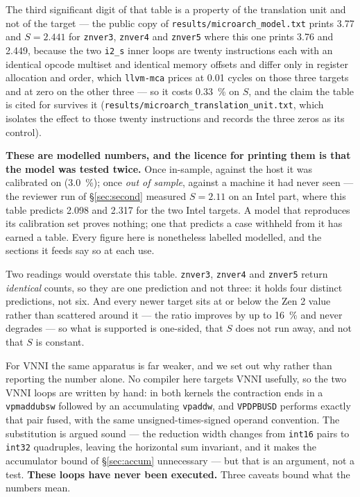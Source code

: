 \documentclass[11pt,a4paper]{article}
\newcommand{\code}[1]{\texttt{#1}}
\begin{document}
The third significant digit of that table is a property of the translation unit
and not of the target --- the public copy of
\code{results/microarch\_model.txt} prints \num{3.77} and $S=\num{2.441}$ for
\code{znver3}, \code{znver4} and \code{znver5} where this one prints \num{3.76}
and \num{2.449}, because the two \code{i2\_s} inner loops are twenty
instructions each with an identical opcode multiset and identical memory offsets
and differ only in register allocation and order, which \code{llvm-mca} prices
at \num{0.01} cycles on those three targets and at zero on the other three ---
so it costs \SI{0.33}{\percent} on $S$, and the claim the table is cited for
survives it (\code{results/microarch\_translation\_unit.txt}, which isolates
the effect to those twenty instructions and records the three zeros as its
control).

\textbf{These are modelled numbers, and the licence for printing them is that
the model was tested twice.} Once in-sample, against the host it was calibrated
on (\SI{3.0}{\percent}); once \emph{out of sample}, against a machine it had
never seen --- the reviewer run of \S\ref{sec:second} measured $S = \num{2.11}$
on an Intel part, where this table predicts \num{2.098} and \num{2.317} for the
two Intel targets. A model that reproduces its calibration set proves nothing;
one that predicts a case withheld from it has earned a table. Every figure here
is nonetheless labelled modelled, and the sections it feeds say so at each use.

Two readings would overstate this table. \code{znver3}, \code{znver4} and
\code{znver5} return \emph{identical} counts, so they are one prediction and not
three: it holds four distinct predictions, not six. And every newer target sits
at or below the Zen 2 value rather than scattered around it --- the ratio
improves by up to \SI{16}{\percent} and never degrades --- so what is supported
is one-sided, that $S$ does not run away, and not that $S$ is constant.

For VNNI the same apparatus is far weaker, and we set out why rather than
reporting the number alone. No compiler here targets VNNI usefully, so the two
VNNI loops are written by hand: in both kernels the contraction ends in a
\code{vpmaddubsw} followed by an accumulating \code{vpaddw}, and \code{VPDPBUSD}
performs exactly that pair fused, with the same unsigned-times-signed operand
convention. The substitution is argued sound --- the reduction width changes
from \code{int16} pairs to \code{int32} quadruples, leaving the horizontal sum
invariant, and it makes the accumulator bound of \S\ref{sec:accum} unnecessary
--- but that is an argument, not a test. \textbf{These loops have never been
executed.} Three caveats bound what the numbers mean.
\end{document}
